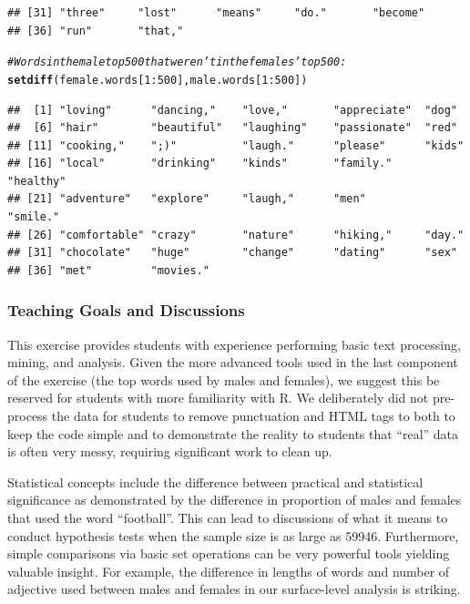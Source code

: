 \documentclass{article}\usepackage[]{graphicx}\usepackage[]{color}
\makeatletter
\newcommand{\hlnum}[1]{\textcolor[rgb]{0.686,0.059,0.569}{#1}}%
\newcommand{\hlcom}[1]{\textcolor[rgb]{0.678,0.584,0.686}{\textit{#1}}}%
\newcommand{\hlopt}[1]{\textcolor[rgb]{0,0,0}{#1}}%
\newcommand{\hlstd}[1]{\textcolor[rgb]{0.345,0.345,0.345}{#1}}%
\newcommand{\hlkwd}[1]{\textcolor[rgb]{0.737,0.353,0.396}{\textbf{#1}}}%
\newenvironment{kframe}{%
 \def\at@end@of@kframe{}%
 \ifinner\ifhmode%
  \def\at@end@of@kframe{\end{minipage}}%
  \begin{minipage}{\columnwidth}%
 \fi\fi%
 \def\FrameCommand##1{\hskip\@totalleftmargin \hskip-\fboxsep
 \colorbox{shadecolor}{##1}\hskip-\fboxsep
     \hskip-\linewidth \hskip-\@totalleftmargin \hskip\columnwidth}%
 \MakeFramed {\advance\hsize-\width
   \@totalleftmargin\z@ \linewidth\hsize
   \@setminipage}}%
 {\par\unskip\endMakeFramed%
 \at@end@of@kframe}
\newenvironment{knitrout}{}{} %
\makeatother
\begin{document}
\begin{knitrout}
\begin{kframe}
\begin{verbatim}
## [31] "three"     "lost"      "means"     "do."       "become"   
## [36] "run"       "that,"
\end{verbatim}
\begin{alltt}
\hlcom{# Words in the male top 500 that weren't in the females' top 500:}
\hlkwd{setdiff}\hlstd{(female.words[}\hlnum{1}\hlopt{:}\hlnum{500}\hlstd{], male.words[}\hlnum{1}\hlopt{:}\hlnum{500}\hlstd{])}
\end{alltt}
\begin{verbatim}
##  [1] "loving"      "dancing,"    "love,"       "appreciate"  "dog"        
##  [6] "hair"        "beautiful"   "laughing"    "passionate"  "red"        
## [11] "cooking,"    ";)"          "laugh."      "please"      "kids"       
## [16] "local"       "drinking"    "kinds"       "family."     "healthy"    
## [21] "adventure"   "explore"     "laugh,"      "men"         "smile."     
## [26] "comfortable" "crazy"       "nature"      "hiking,"     "day."       
## [31] "chocolate"   "huge"        "change"      "dating"      "sex"        
## [36] "met"         "movies."
\end{verbatim}
\end{kframe}
\end{knitrout}




\subsubsection{Teaching Goals and Discussions}
This exercise provides students with experience performing basic text processing, mining, and analysis.  Given the more advanced tools used in the last component of the exercise (the top words used by males and females), we suggest this be reserved for students with more familiarity with R.  We deliberately did not pre-process the data for students to remove punctuation and HTML tags to both to keep the code simple and to demonstrate the reality to students that ``real'' data is often very messy, requiring significant work to clean up.

Statistical concepts include the difference between practical and statistical significance as demonstrated by the difference in proportion of males and females that used the word ``football''.  This can lead to discussions of what it means to conduct hypothesis tests when the sample size is as large as 59946.  Furthermore, simple comparisons via basic set operations can be very powerful tools yielding valuable insight.  For example, the difference in lengths of words and number of adjective used between males and females in our surface-level analysis is striking.
\end{document}
